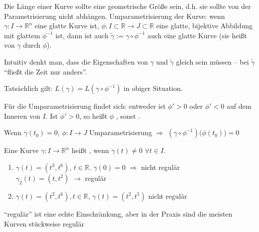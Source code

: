 \begin{underlinedenvironment}[Bemerkung]
	Die Länge einer Kurve sollte eine geometrische Größe sein, d.h. sie sollte von der Parametrisierung nicht abhängen.
	Umparametrisierung der Kurve: wenn $\gamma\!: I\to\mathbb{R}^n$ eine glatte Kurve ist, $\phi\!:I\subset\mathbb{R}\to J\subset\mathbb{R}$ eine glatte, bijektive Abbildung mit glattem $\phi^{-1}$ ist, dann ist auch $\tilde{\gamma}:= \gamma\circ\phi^{-1}$ auch eine glatte Kurve (sie heißt  von $\gamma$ durch $\phi$).
	
	Intuitiv denkt man, dass die Eigenschaften von $\gamma$ und $\tilde{\gamma}$ gleich sein müssen -- bei $\tilde{\gamma}$ "`fließt die Zeit nur anders"'.
	
	Tatsächlich gilt: $L(\gamma) = L(\gamma\circ \phi^{-1})$ in obiger Situation.
\end{underlinedenvironment}
\begin{underlinedenvironment}[Bemerkung]
	Für die Umparametrisierung findet sich: entweder ist $\phi' > 0$ oder $\phi' < 0$ auf dem Inneren von $I$. Ist $\phi' > 0$, so heißt $\phi$ , sonst .
\end{underlinedenvironment}
\begin{plainenvironment}[Beobachtung]
	Wenn $\dot{\gamma}(t_0) = 0$, $\phi\!:I\to J$ Umparametrisierung $\Rightarrow$ $(\gamma\circ\phi^{-1})\big(\phi(t_0)\big) = 0$
\end{plainenvironment}

\begin{definition}
	Eine Kurve $\gamma\!:I\to\mathbb{R}^n$ heißt , wenn $\dot{\gamma}(t) \neq 0$ $\forall t\in I$.
\end{definition}

\begin{example}\hspace*{0pt}
	\vspace*{\dimexpr-\baselineskip+1mm\relax}
	\begin{enumerate}[label={\arabic*)}]
		\item $\gamma(t) = (t^3, t^6)$, $t\in\mathbb{R}$. $\dot{\gamma}(0) = 0$ $\Rightarrow$ nicht regulär\\
		$\gamma_2(t) = (t, t^2)$ $\rightarrow$ regulär
		\item $\gamma(t) = (t^2, t^6), t\in \mathbb{R}$, $\gamma(t) = (t^2, t^5)$ nicht regulär
	\end{enumerate}
\end{example}
\begin{underlinedenvironment}[Bemerkung]
	"`regulär"' ist eine echte Einschränkung, aber in der Praxis sind die meisten Kurven stückweise regulär
\end{underlinedenvironment}

